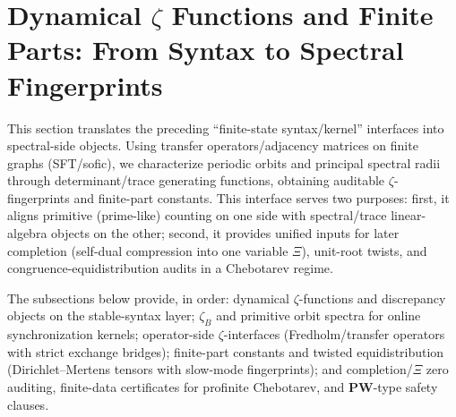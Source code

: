 \section{Dynamical \texorpdfstring{$\zeta$}{zeta} Functions and Finite Parts: From Syntax to Spectral Fingerprints}\label{sec:zeta-finite-part}

This section translates the preceding ``finite-state syntax/kernel'' interfaces into spectral-side objects. Using transfer operators/adjacency matrices on finite graphs (SFT/sofic), we characterize periodic orbits and principal spectral radii through determinant/trace generating functions, obtaining auditable \(\zeta\)-fingerprints and finite-part constants. This interface serves two purposes: first, it aligns primitive (prime-like) counting on one side with spectral/trace linear-algebra objects on the other; second, it provides unified inputs for later completion (self-dual compression into one variable \(\Xi\)), unit-root twists, and congruence-equidistribution audits in a Chebotarev regime.\par
The subsections below provide, in order: dynamical \(\zeta\)-functions and discrepancy objects on the stable-syntax layer; \(\zeta_B\) and primitive orbit spectra for online synchronization kernels; operator-side \(\zeta\)-interfaces (Fredholm/transfer operators with strict exchange bridges); finite-part constants and twisted equidistribution (Dirichlet--Mertens tensors with slow-mode fingerprints); and completion/\(\Xi\) zero auditing, finite-data certificates for profinite Chebotarev, and \(\mathbf{PW}\)-type safety clauses.










